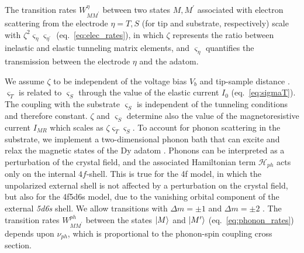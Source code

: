 \documentclass[
reprint,amsmath,amssymb,aps]{revtex4-2}
\begin{document}
The transition rates $W_{MM^{\prime}}^{\eta}$ between two states $M,M^{\prime}$ associated with electron scattering from the electrode $\eta=T,S$ (for tip and substrate, respectively) scale with $\zeta^2 \varsigma_{\eta} \varsigma_{\eta^{\prime}}$ (eq.~\ref{eq:elec_rates}), in which $\zeta$ represents the ratio between inelastic and elastic tunneling matrix elements, and
$\varsigma_{\eta}$ quantifies the transmission between the electrode $\eta$ and the adatom.




We assume $\zeta$ to be independent of the voltage bias $V_b$ and tip-sample distance \cite{fern2009,paul_ControlMillisecondSpin_2017,lorenteEfficientSpinTransitions2009,nussinovNoiseSpectroscopySingle2003}.
$\varsigma_T$ is related to $\varsigma_S$ through the value of the elastic current $I_0$ (eq.~\ref{eq:sigmaT}). The coupling with the substrate $\varsigma_S$ is independent of the tunneling conditions and therefore constant. $\zeta$ and $\varsigma_S$ determine also the value of the magnetoresistive current $I_{MR}$ which scales as $\zeta \varsigma_{T} \varsigma_{S}$.
To account for phonon scattering in the substrate, we implement a two-dimensional phonon bath that can excite and relax the magnetic states of the Dy adatom \cite{cervetti2016,politi_tunneling_1995,Leuenberger2000}. Phonons can be interpreted as a perturbation of the crystal field, and the associated Hamiltonian term $\mathcal{H}_{ph}$ acts only on the internal $4f$-shell. This is true for the 4f model, in which the unpolarized external shell is not affected by a perturbation on the crystal field, but also for the 4f5d6s model, due to the vanishing orbital component of the external \textit{5d6s} shell. We allow transitions with $\Delta m = \pm 1$ and $\Delta m = \pm 2$ \citep{cervetti2016}. 
The transition rates $W_{MM^{\prime}}^{ph}$ between the states $\ket{M}$ and $\ket{M^{\prime}}$ (eq.~\ref{eq:phonon_rates}) depends upon $\nu_{ph}$, which is proportional to the phonon-spin coupling cross section.
\end{document}
